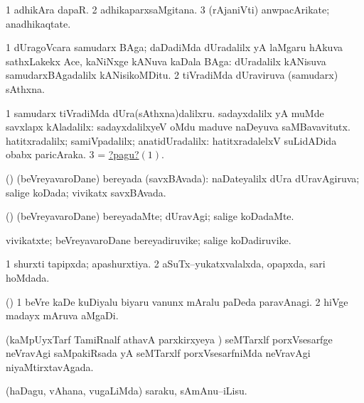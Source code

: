 \bentry
{}
\gl{\nA}
\bmng
\bnum
\num{1} adhikAra dapaR. 
\num{2} adhikaparxsaMgitana. 
\num{3} (rAjaniVti) anwpacArikate; anadhikaqtate. 
\enum
\emng
\eentry

\bentry
{}
\gl{\nA}
\bmng
\bnum
\num{1} dUragoVcara samudarx BAga; daDadiMda dUradalilx yA laMgaru hAkuva sathxLakekx Ace, kaNiNxge kANuva kaDala BAga:  dUradalilx kANisuva samudarxBAgadalilx kANisikoMDitu. 
\num{2} tiVradiMda dUraviruva (samudarx) sAthxna. 
\enum
\emng

\noindent
\gl{\pagu}
\bmng
\hypertarget{offing pagu1}{} 
\bnum
\num{1}  samudarx tiVradiMda dUra(sAthxna)dalilxru. 
  
\banum
{} sadayxdalilx yA muMde savxlapx kAladalilx:  sadayxdalilxyeV oMdu maduve naDeyuva saMBavavitutx. 
 hatitxradalilx; samiVpadalilx; anatidUradalilx:  hatitxradalelxV suLidADida obabx paricAraka. 
\eanum
\numie
\num{3}  = \hyperlink{offing pagu1}{?pagu?\((1)\)}. 
\enum
\emng
\eentry

\bentry
{}
\gl{\gu}
\bmng
(\AmA) (beVreyavaroDane) bereyada (savxBAvada): naDateyalilx dUra dUravAgiruva; salige koDada; vivikatx savxBAvada. 
\emng
\eentry

\bentry
{}
\gl{\kirxvi}
\bmng
(\AmA) (beVreyavaroDane) bereyadaMte; dUravAgi; salige koDadaMte. 
\emng
\eentry

\bentry
{}
\gl{\nA}
\bmng
vivikatxte; beVreyavaroDane bereyadiruvike; salige koDadiruvike. 
\emng
\eentry

\bentry
{}
\gl{\gu}
\bmng
\bnum
\num{1} shurxti tapipxda; apashurxtiya. 
\num{2} aSuTx--yukatxvalalxda, opapxda, sari hoMdada. 
\enum
\emng
\eentry

\bentry
{}
\gl{\nA}
\bmng
(\birx) 
\bnum
\num{1} beVre kaDe kuDiyalu biyaru \mo vanunx mAralu paDeda paravAnagi. 
\num{2} hiVge madayx mAruva aMgaDi. 
\enum
\emng
\eentry

\bentry
{}
\gl{\gu}
\bmng
(kaMpUyxTarf TamiRnalf athavA parxkirxyeya \vi) seMTarxlf porxVsesarfge neVravAgi saMpakiRsada yA seMTarxlf porxVsesarfniMda neVravAgi niyaMtirxtavAgada. 
\emng
\eentry

\bentry
{}
\gl{\sakirx}
\bmng
(haDagu, vAhana, \mo vugaLiMda) saraku, sAmAnu--iLisu. 
\emng
\eentry

